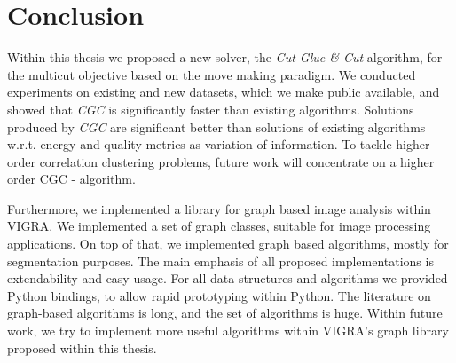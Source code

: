 \chapter{Conclusion}\label{ch:conclusion}

Within this thesis we proposed
a new solver, the \emph{Cut Glue \& Cut} algorithm, for the multicut objective
based on the move making paradigm.
We conducted experiments on existing 
and new datasets, which we make public available,
and showed that \emph{CGC}
is significantly faster than existing 
algorithms.
Solutions produced by \emph{CGC} are significant
better than solutions of existing  algorithms w.r.t. energy
and quality metrics as variation of information.
To tackle higher order correlation clustering problems,
future work will concentrate on a higher order CGC - algorithm.


Furthermore, we implemented a library
for graph based image analysis within VIGRA.
We implemented a set of graph classes, 
suitable for image processing applications.
On top of that, we implemented 
graph based algorithms, mostly for
segmentation purposes.
The main emphasis of all proposed
implementations is extendability and easy usage.
For all data-structures and
algorithms we provided Python bindings,
to allow rapid prototyping 
within Python.
The literature on graph-based
algorithms is long, and the set of
algorithms is huge.
Within future work, we try to implement
more useful algorithms within
VIGRA's graph library proposed within this thesis. 

